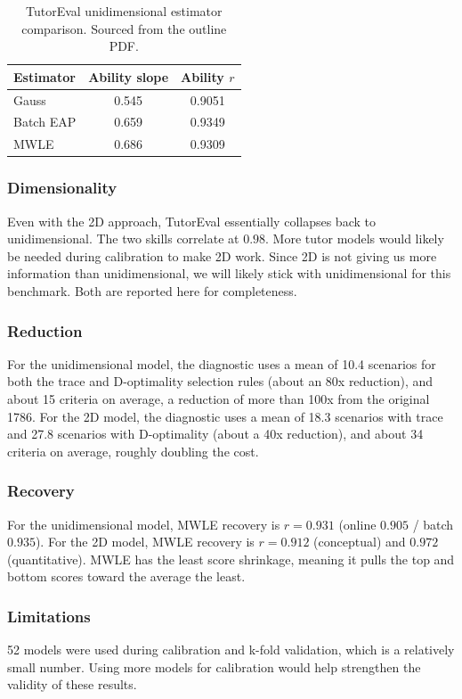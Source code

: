 \begin{table}[t]
  \centering
  \caption{TutorEval unidimensional estimator comparison. Sourced from the
    outline PDF.}
  \label{tab:te-uni}
  \begin{tabular}{lcc}
    \toprule
    Estimator & Ability slope & Ability $r$ \\
    \midrule
    Gauss     & 0.545 & 0.9051 \\
    Batch EAP & 0.659 & 0.9349 \\
    MWLE      & 0.686 & 0.9309 \\
    \bottomrule
  \end{tabular}
\end{table}

\subsubsection{Dimensionality}
Even with the 2D approach, TutorEval essentially collapses back to
unidimensional. The two skills correlate at $0.98$. More tutor models would
likely be needed during calibration to make 2D work. Since 2D is not giving us
more information than unidimensional, we will likely stick with unidimensional for
this benchmark. Both are reported here for completeness.

\subsubsection{Reduction}
For the unidimensional model, the diagnostic uses a mean of 10.4 scenarios for
both the trace and D-optimality selection rules (about an 80x reduction), and
about 15 criteria on average, a reduction of more than 100x from the original
1786. For the 2D model, the diagnostic uses a mean of 18.3 scenarios with trace
and 27.8 scenarios with D-optimality (about a 40x reduction), and about 34
criteria on average, roughly doubling the cost.

\subsubsection{Recovery}
For the unidimensional model, MWLE recovery is $r=0.931$ (online $0.905$ / batch
$0.935$). For the 2D model, MWLE recovery is $r=0.912$ (conceptual) and $0.972$
(quantitative). MWLE has the least score shrinkage, meaning it pulls the top and
bottom scores toward the average the least.

\subsubsection{Limitations}
52 models were used during calibration and k-fold validation, which is a
relatively small number. Using more models for calibration would help strengthen
the validity of these results.
